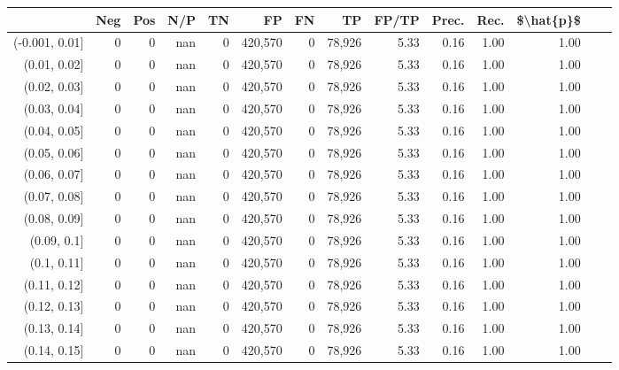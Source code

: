 \begin{tabular}{rrrrrrrrrrrrrr}
\toprule
{} &      Neg &     Pos &    N/P &       TN &       FP &      FN &      TP & FP/TP & Prec. &  Rec. & \$\textbackslash hat\{p\}\$ \\
\midrule
(-0.001, 0.01] &        0 &       0 &    nan &        0 &  420,570 &       0 &  78,926 &  5.33 &  0.16 &  1.00 &      1.00 \\
(0.01, 0.02]   &        0 &       0 &    nan &        0 &  420,570 &       0 &  78,926 &  5.33 &  0.16 &  1.00 &      1.00 \\
(0.02, 0.03]   &        0 &       0 &    nan &        0 &  420,570 &       0 &  78,926 &  5.33 &  0.16 &  1.00 &      1.00 \\
(0.03, 0.04]   &        0 &       0 &    nan &        0 &  420,570 &       0 &  78,926 &  5.33 &  0.16 &  1.00 &      1.00 \\
(0.04, 0.05]   &        0 &       0 &    nan &        0 &  420,570 &       0 &  78,926 &  5.33 &  0.16 &  1.00 &      1.00 \\
(0.05, 0.06]   &        0 &       0 &    nan &        0 &  420,570 &       0 &  78,926 &  5.33 &  0.16 &  1.00 &      1.00 \\
(0.06, 0.07]   &        0 &       0 &    nan &        0 &  420,570 &       0 &  78,926 &  5.33 &  0.16 &  1.00 &      1.00 \\
(0.07, 0.08]   &        0 &       0 &    nan &        0 &  420,570 &       0 &  78,926 &  5.33 &  0.16 &  1.00 &      1.00 \\
(0.08, 0.09]   &        0 &       0 &    nan &        0 &  420,570 &       0 &  78,926 &  5.33 &  0.16 &  1.00 &      1.00 \\
(0.09, 0.1]    &        0 &       0 &    nan &        0 &  420,570 &       0 &  78,926 &  5.33 &  0.16 &  1.00 &      1.00 \\
(0.1, 0.11]    &        0 &       0 &    nan &        0 &  420,570 &       0 &  78,926 &  5.33 &  0.16 &  1.00 &      1.00 \\
(0.11, 0.12]   &        0 &       0 &    nan &        0 &  420,570 &       0 &  78,926 &  5.33 &  0.16 &  1.00 &      1.00 \\
(0.12, 0.13]   &        0 &       0 &    nan &        0 &  420,570 &       0 &  78,926 &  5.33 &  0.16 &  1.00 &      1.00 \\
(0.13, 0.14]   &        0 &       0 &    nan &        0 &  420,570 &       0 &  78,926 &  5.33 &  0.16 &  1.00 &      1.00 \\
(0.14, 0.15]   &        0 &       0 &    nan &        0 &  420,570 &       0 &  78,926 &  5.33 &  0.16 &  1.00 &      1.00 \\

\end{tabular}
